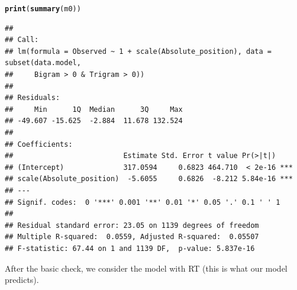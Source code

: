 \documentclass{article}\usepackage[]{graphicx}\usepackage[]{color}
\makeatletter
\newcommand{\hlstd}[1]{\textcolor[rgb]{0.345,0.345,0.345}{#1}}%
\newcommand{\hlkwd}[1]{\textcolor[rgb]{0.737,0.353,0.396}{\textbf{#1}}}%
\newenvironment{kframe}{%
 \def\at@end@of@kframe{}%
 \ifinner\ifhmode%
  \def\at@end@of@kframe{\end{minipage}}%
  \begin{minipage}{\columnwidth}%
 \fi\fi%
 \def\FrameCommand##1{\hskip\@totalleftmargin \hskip-\fboxsep
 \colorbox{shadecolor}{##1}\hskip-\fboxsep
     \hskip-\linewidth \hskip-\@totalleftmargin \hskip\columnwidth}%
 \MakeFramed {\advance\hsize-\width
   \@totalleftmargin\z@ \linewidth\hsize
   \@setminipage}}%
 {\par\unskip\endMakeFramed%
 \at@end@of@kframe}
\newenvironment{knitrout}{}{} %
\makeatother
\begin{document}
\begin{knitrout}
\begin{kframe}
\begin{alltt}
\hlkwd{print}\hlstd{(}\hlkwd{summary}\hlstd{(m0))}
\end{alltt}
\begin{verbatim}
## 
## Call:
## lm(formula = Observed ~ 1 + scale(Absolute_position), data = subset(data.model, 
##     Bigram > 0 & Trigram > 0))
## 
## Residuals:
##     Min      1Q  Median      3Q     Max 
## -49.607 -15.625  -2.884  11.678 132.524 
## 
## Coefficients:
##                          Estimate Std. Error t value Pr(>|t|)    
## (Intercept)              317.0594     0.6823 464.710  < 2e-16 ***
## scale(Absolute_position)  -5.6055     0.6826  -8.212 5.84e-16 ***
## ---
## Signif. codes:  0 '***' 0.001 '**' 0.01 '*' 0.05 '.' 0.1 ' ' 1
## 
## Residual standard error: 23.05 on 1139 degrees of freedom
## Multiple R-squared:  0.0559,	Adjusted R-squared:  0.05507 
## F-statistic: 67.44 on 1 and 1139 DF,  p-value: 5.837e-16
\end{verbatim}
\end{kframe}
\end{knitrout}

After the basic check, we consider the model with RT (this is what our model predicts).
\end{document}
